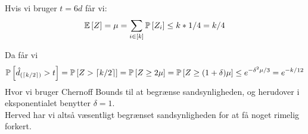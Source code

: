 Hvis vi bruger $t = 6d$ får vi:
$$
  \mathbb{E} \left[  Z  \right] = \mu = \sum_{i \in [k]} \mathbb{P} \left[  Z_i  \right] \leq k * 1/4 = k/4
$$

Da får vi
\begin{align*}
  \mathbb{P} \left[  \hat d_{(\left\lceil k/2 \right\rceil)} > t  \right]
  = \mathbb{P} \left[  Z > \left\lceil k/2 \right\rceil  \right]
  = \mathbb{P} \left[  Z \geq 2 \mu  \right]
  = \mathbb{P} \left[  Z \geq (1 + \delta) \mu   \right]
  \leq e^{- \delta^2 \mu / 3}
  = e^{- k / 12}
\end{align*}
Hvor vi bruger Chernoff Bounds til at begrænse sandsynligheden, og herudover i eksponentialet benytter $\delta = 1$.\\

Herved har vi altså væsentligt begrænset sandsynligheden for at få noget rimelig forkert.










